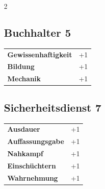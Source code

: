 \begin{multicols}{2}
\begin{tcolorbox}

\end{tcolorbox}

\begin{tcolorbox}
    \subsection*{Buchhalter \hfill \small{5 }}
    \tcblower




\begin{tabular}{@{}ll@{}}
    \textbf{Gewissenhaftigkeit} & +1\\
    \textbf{Bildung} & +1\\
    \textbf{Mechanik} & +1\\
\end{tabular}


\end{tcolorbox}

\begin{tcolorbox}
    \subsection*{Sicherheitsdienst \hfill \small{7 }}
    \tcblower




\begin{tabular}{@{}ll@{}}
    \textbf{Ausdauer} & +1\\
    \textbf{Auffassungsgabe} & +1\\
    \textbf{Nahkampf} & +1\\
    \textbf{Einschüchtern} & +1\\
    \textbf{Wahrnehmung} & +1\\
\end{tabular}


\end{tcolorbox}
\end{multicols}
